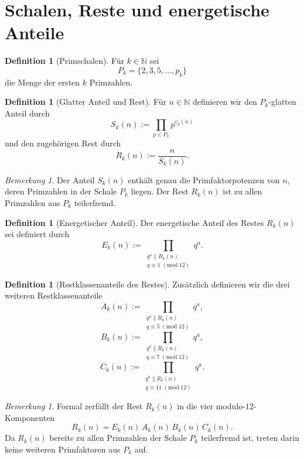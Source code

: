 \documentclass[11pt,a4paper]{article}
\theoremstyle{definition}
\newtheorem{definition}[satz]{Definition}
\theoremstyle{remark}
\newtheorem{bemerkung}[satz]{Bemerkung}
\begin{document}
	\section{Schalen, Reste und energetische Anteile}
	
	\begin{definition}[Primschalen]
		Für \(k\in\mathbb{N}\) sei
		\[
		P_k=\{2,3,5,\dots,p_k\}
		\]
		die Menge der ersten \(k\) Primzahlen.
	\end{definition}
	
	\begin{definition}[Glatter Anteil und Rest]
		Für \(n\in\mathbb{N}\) definieren wir den \(P_k\)-glatten Anteil durch
		\[
		S_k(n):=\prod_{p\in P_k} p^{v_p(n)}
		\]
		und den zugehörigen Rest durch
		\[
		R_k(n):=\frac{n}{S_k(n)}.
		\]
	\end{definition}
	
	\begin{bemerkung}
		Der Anteil \(S_k(n)\) enthält genau die Primfaktorpotenzen von \(n\), deren Primzahlen in der
		Schale \(P_k\) liegen. Der Rest \(R_k(n)\) ist zu allen Primzahlen aus \(P_k\) teilerfremd.
	\end{bemerkung}
	
	\begin{definition}[Energetischer Anteil]
		Der energetische Anteil des Restes \(R_k(n)\) sei definiert durch
		\[
		E_k(n):=\prod_{\substack{q^a\parallel R_k(n)\\ q\equiv 1\;(\mathrm{mod}\;12)}} q^a.
		\]
	\end{definition}
	
	\begin{definition}[Restklassenanteile des Restes]
		Zusätzlich definieren wir die drei weiteren Restklassenanteile
		\[
		A_k(n):=\prod_{\substack{q^a\parallel R_k(n)\\ q\equiv 5\;(\mathrm{mod}\;12)}} q^a,
		\]
		\[
		B_k(n):=\prod_{\substack{q^a\parallel R_k(n)\\ q\equiv 7\;(\mathrm{mod}\;12)}} q^a,
		\]
		\[
		C_k(n):=\prod_{\substack{q^a\parallel R_k(n)\\ q\equiv 11\;(\mathrm{mod}\;12)}} q^a.
		\]
	\end{definition}
	
	\begin{bemerkung}
		Formal zerfällt der Rest \(R_k(n)\) in die vier modulo-\(12\)-Komponenten
		\[
		R_k(n)=E_k(n)\,A_k(n)\,B_k(n)\,C_k(n).
		\]
		Da \(R_k(n)\) bereits zu allen Primzahlen der Schale \(P_k\) teilerfremd ist, treten darin keine
		weiteren Primfaktoren aus \(P_k\) auf.
	\end{bemerkung}
	
\end{document}
